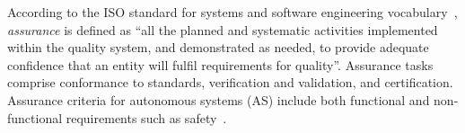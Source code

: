\documentclass[runningheads]{llncs}
\begin{document}
According to the ISO standard for systems and software engineering vocabulary~\cite{ISO24765:2017}, \emph{assurance} is defined as ``all the planned and systematic activities implemented within the quality system, and demonstrated as needed, to provide adequate confidence that an entity will fulfil requirements for quality''.
%
Assurance tasks comprise conformance to standards, verification and validation, and certification. 
Assurance criteria for autonomous systems (AS) include both functional and non-functional requirements such as safety~\cite{Cheng2014}. 


\end{document}
